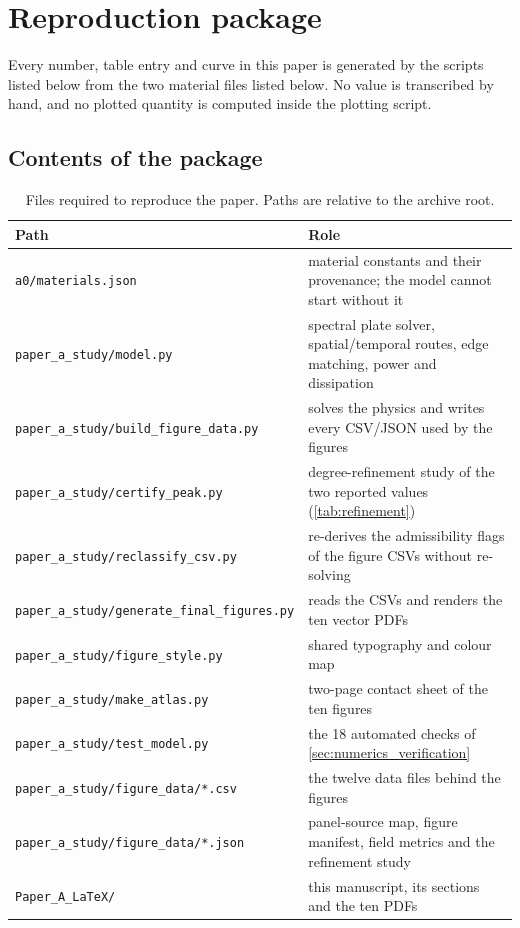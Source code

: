 \section{Reproduction package}
\label{app:repro}

Every number, table entry and curve in this paper is generated by the scripts
listed below from the two material files listed below.  No value is transcribed
by hand, and no plotted quantity is computed inside the plotting script.

\subsection{Contents of the package}
\label{app:repro_contents}

\begin{table}[h]
\centering
\caption{Files required to reproduce the paper.  Paths are relative to the
archive root.}
\label{tab:package}
\small
\begin{tabular}{@{}ll@{}}
\toprule
Path & Role \\
\midrule
\texttt{a0/materials.json} & material constants and their provenance; the model
cannot start without it \\
\texttt{paper\_a\_study/model.py} & spectral plate solver, spatial/temporal
routes, edge matching, power and dissipation \\
\texttt{paper\_a\_study/build\_figure\_data.py} & solves the physics and writes
every CSV/JSON used by the figures \\
\texttt{paper\_a\_study/certify\_peak.py} & degree-refinement study of the two
reported values (\cref{tab:refinement}) \\
\texttt{paper\_a\_study/reclassify\_csv.py} & re-derives the admissibility flags
of the figure CSVs without re-solving \\
\texttt{paper\_a\_study/generate\_final\_figures.py} & reads the CSVs and renders
the ten vector PDFs \\
\texttt{paper\_a\_study/figure\_style.py} & shared typography and colour map \\
\texttt{paper\_a\_study/make\_atlas.py} & two-page contact sheet of the ten
figures \\
\texttt{paper\_a\_study/test\_model.py} & the 18 automated checks of
\cref{sec:numerics_verification} \\
\texttt{paper\_a\_study/figure\_data/*.csv} & the twelve data files behind the
figures \\
\texttt{paper\_a\_study/figure\_data/*.json} & panel-source map, figure manifest,
field metrics and the refinement study \\
\texttt{Paper\_A\_LaTeX/} & this manuscript, its sections and the ten PDFs \\
\bottomrule
\end{tabular}
\end{table}

